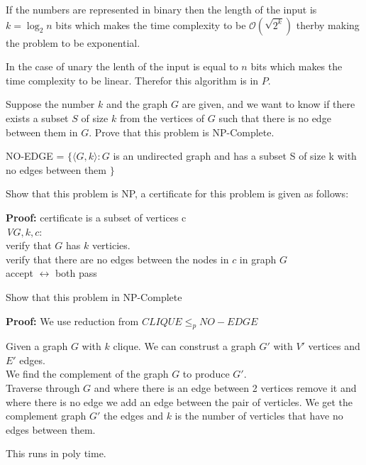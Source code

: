 \documentclass[12pt]{exam}
\begin{document}
\begin{questions}
\begin{solution}
    If the numbers are represented in binary then the length of the input is $k = \log_{2} n$ bits which makes the time complexity to be $\mathcal{O}(\sqrt{2^{k}})$ therby making the problem to be exponential.


    In the case of unary the lenth of the input is equal to $n$ bits which makes the time complexity to be linear. Therefor this algorithm is in $P$.

  \end{solution}

  \question{} %

  Suppose the number $k$ and the graph $G$ are given, and we want to know if there exists a subset $S$ of size $k$ from the vertices of $G$ such that there is no edge between them in $G$.
  Prove that this problem is NP-Complete.

  \begin{solution}

    NO-EDGE = $\{ \langle G, k\rangle : G$ is an undirected graph and has a subset S of size k with no edges between them $\}$

    Show that this problem is NP, a certificate for this problem is given as follows:

    \textbf{Proof:} certificate is a subset of vertices c\\
    \emph{V$G,k,c$}:\\
    \null \quad verify that $G$ has $k$ verticies.\\
    \null \quad verify that there are no edges between the nodes in $c$ in graph $G$\\
    \null \quad accept $\leftrightarrow$ both pass

    Show that this problem in NP-Complete

    \textbf{Proof:} We use reduction from $CLIQUE \leq_{p} NO-EDGE$

    Given a graph $G$ with $k$ clique. We can construst a graph $G'$ with $V'$ vertices and $E'$ edges.\\
    \null \quad We find the complement of the graph $G$ to produce $G'$.\\
    \null \quad Traverse through $G$ and where there is an edge between 2 vertices remove it and where there is no edge we add an edge between the pair of verticles.
    \null \quad We get the complement graph $G'$ the edges and $k$ is the number of verticles that have no edges between them.

    This runs in poly time.

  \end{solution}



\end{questions}
\end{document}
